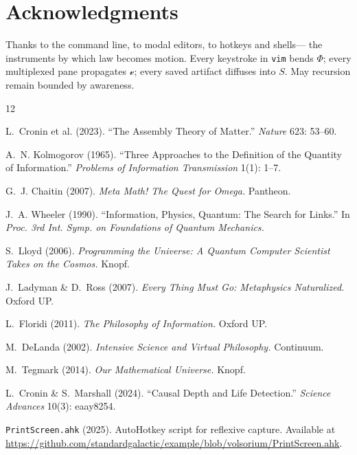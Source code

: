 \documentclass[12pt,a4paper]{article}
\theoremstyle{plain}
\theoremstyle{definition}
\theoremstyle{remark}
\newcommand{\Phifield}{\Phi}
\newcommand{\vfield}{\mathcal{v}}
\newcommand{\Sfield}{S}
\begin{document}
\section*{Acknowledgments}

Thanks to the command line, to modal editors, to hotkeys and shells— the instruments by which law becomes motion. Every keystroke in \texttt{vim} bends $\Phifield$; every multiplexed pane propagates $\vfield$; every saved artifact diffuses into $\Sfield$. May recursion remain bounded by awareness.

\begin{thebibliography}{12}

L.~Cronin et al. (2023). ``The Assembly Theory of Matter.'' \emph{Nature} 623: 53–60.

A.~N. Kolmogorov (1965). ``Three Approaches to the Definition of the Quantity of Information.'' \emph{Problems of Information Transmission} 1(1): 1–7.

G.~J. Chaitin (2007). \emph{Meta Math! The Quest for Omega.} Pantheon.

J.~A. Wheeler (1990). ``Information, Physics, Quantum: The Search for Links.'' In \emph{Proc. 3rd Int. Symp. on Foundations of Quantum Mechanics.}

S.~Lloyd (2006). \emph{Programming the Universe: A Quantum Computer Scientist Takes on the Cosmos.} Knopf.

J.~Ladyman \& D.~Ross (2007). \emph{Every Thing Must Go: Metaphysics Naturalized.} Oxford UP.

L.~Floridi (2011). \emph{The Philosophy of Information.} Oxford UP.

M.~DeLanda (2002). \emph{Intensive Science and Virtual Philosophy.} Continuum.

M.~Tegmark (2014). \emph{Our Mathematical Universe.} Knopf.

L.~Cronin \& S.~Marshall (2024). ``Causal Depth and Life Detection.'' \emph{Science Advances} 10(3): eaay8254.

\texttt{PrintScreen.ahk} (2025). AutoHotkey script for reflexive capture. Available at \url{https://github.com/standardgalactic/example/blob/volsorium/PrintScreen.ahk}.

\end{thebibliography}

\printindex
\end{document}
